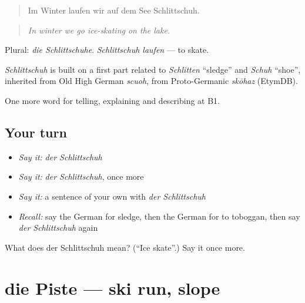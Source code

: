 \begin{quote}
Im Winter laufen wir auf dem See Schlittschuh.
\end{quote}

\begin{quote}
\emph{In winter we go ice-skating on the lake.}
\end{quote}

Plural: \emph{die Schlittschuhe}. \emph{Schlittschuh laufen} — to skate.

\begin{cousinweb}
\emph{Schlittschuh} is built on a first part related to \emph{Schlitten} \textquotedblleft{}sledge\textquotedblright{} and \emph{Schuh} \textquotedblleft{}shoe\textquotedblright{}, inherited from Old High German \emph{scuoh}, from Proto-Germanic \emph{skōhaz} (EtymDB).
\end{cousinweb}

\begin{grammarlens}[title={What you've built}]
One more word for telling, explaining and describing at B1.
\end{grammarlens}

\subsection*{Your turn}
\begin{itemize}
\raggedright
  \item \emph{Say it:} \emph{der Schlittschuh}
  \item \emph{Say it:} \emph{der Schlittschuh}, once more
  \item \emph{Say it:} a sentence of your own with \emph{der Schlittschuh}
  \item \emph{Recall:} say the German for sledge, then the German for to toboggan, then say \emph{der Schlittschuh} again
\end{itemize}

\begin{tcolorbox}[breakable,colback=teal!4,colframe=teal!35!black,title={Before you move on}]
What does der Schlittschuh mean? (\textquotedblleft{}Ice skate\textquotedblright{}.) Say it once more.
\end{tcolorbox}
\section[die Piste]{die Piste — ski run, slope}

\label{lesson:GE-C512-piste}



